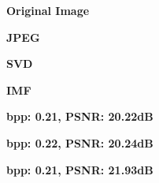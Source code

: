 \begin{figure*}[!t]
    \captionsetup[subfigure]{labelformat=empty,aboveskip=-1pt,belowskip=6pt}
    \centering

    \begin{subfigure}[t]{0.25\textwidth}
        \centering
        \textbf{Original Image}
    \end{subfigure}%
    \begin{subfigure}[t]{0.25\textwidth}
        \centering
        \textbf{JPEG}
    \end{subfigure}%
    \begin{subfigure}[t]{0.25\textwidth}
        \centering
        \textbf{SVD}
    \end{subfigure}%
    \begin{subfigure}[t]{0.25\textwidth}
        \centering
        \textbf{IMF}
    \end{subfigure}

    \begin{subfigure}[t]{0.25\textwidth}
        \centering
    \end{subfigure}%
    \begin{subfigure}[t]{0.25\textwidth}
        \centering
        \caption{\scriptsize\textbf{bpp: 0.21, PSNR: 20.22dB}}
    \end{subfigure}%
    \begin{subfigure}[t]{0.25\textwidth}
        \centering
        \caption{\scriptsize\textbf{bpp: 0.22, PSNR: 20.24dB}}
    \end{subfigure}%
    \begin{subfigure}[t]{0.25\textwidth}
        \centering
        \caption{\scriptsize\textbf{bpp: 0.21, PSNR: 21.93dB}}
    \end{subfigure}


\end{figure*}

